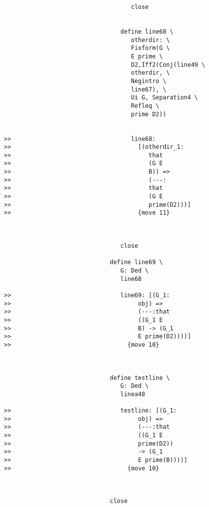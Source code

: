 \documentclass[12pt]{article}
\begin{document}
\begin{verbatim}
                                    close


                                 define line68 \
                                    otherdir: \
                                    Fixform(G \
                                    E prime \
                                    D2,Iff2(Conj(line49 \
                                    otherdir, \
                                    Negintro \
                                    line67), \
                                    Ui G, Separation4 \
                                    Refleq \
                                    prime D2))


>>                                  line68:
>>                                    [(otherdir_1:
>>                                       that
>>                                       (G E
>>                                       B)) =>
>>                                       (---:
>>                                       that
>>                                       (G E
>>                                       prime(D2)))]
>>                                    {move 11}



                                 close

                              define line69 \
                                 G: Ded \
                                 line68

>>                               line69: [(G_1:
>>                                    obj) =>
>>                                    (---:that
>>                                    ((G_1 E
>>                                    B) -> (G_1
>>                                    E prime(D2))))]
>>                                 {move 10}



                              define testline \
                                 G: Ded \
                                 linea48

>>                               testline: [(G_1:
>>                                    obj) =>
>>                                    (---:that
>>                                    ((G_1 E
>>                                    prime(D2))
>>                                    -> (G_1
>>                                    E prime(B))))]
>>                                 {move 10}



                              close


\end{verbatim}
\end{document}
